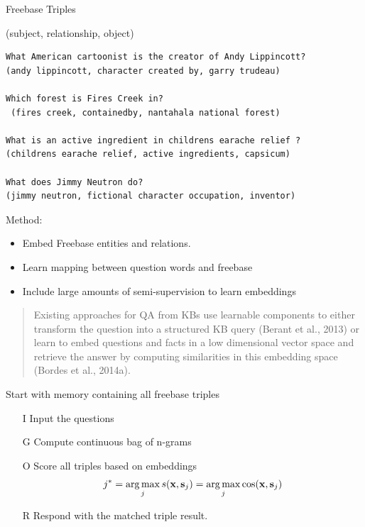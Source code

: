 \documentclass{beamer}
\begin{document}
\begin{frame}[fragile]{Freebase Triples}
  \begin{center}
    (subject, relationship, object)
  \end{center}

\begin{verbatim}
What American cartoonist is the creator of Andy Lippincott? 
(andy lippincott, character created by, garry trudeau)

Which forest is Fires Creek in?
 (fires creek, containedby, nantahala national forest)

What is an active ingredient in childrens earache relief ? 
(childrens earache relief, active ingredients, capsicum)

What does Jimmy Neutron do? 
(jimmy neutron, fictional character occupation, inventor)
\end{verbatim}
\end{frame}

\begin{frame}
  Method:
  \begin{itemize}
  \item Embed Freebase entities and relations.
    \air

  \item Learn mapping between question words and freebase
    \air 

  \item Include large amounts of semi-supervision to learn embeddings

  \end{itemize}
\end{frame}

\begin{frame}
  \begin{quote}
    Existing approaches for QA from
KBs use learnable components to either transform
the question into a structured KB query
(Berant et al., 2013) or learn to embed questions
and facts in a low dimensional vector space and retrieve
the answer by computing similarities in this
embedding space (Bordes et al., 2014a).
  \end{quote}
\end{frame}

\begin{frame}
  Start with memory containing all freebase triples
  \begin{itemize}
  \item[I] Input the questions
  \item[G] Compute continuous bag of n-grams
  \item[O] Score all triples based on embeddings
    \[j^* = \argmax_j s(\boldx, \bolds_j) = \argmax_j \cos(\boldx, \bolds_j)\]
  \item[R] Respond with the matched triple result.
  \end{itemize}
\end{frame}
\end{document}
